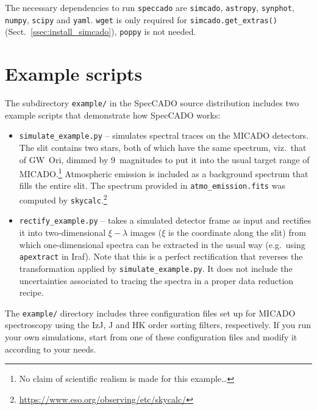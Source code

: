 \documentclass[a4paper,twoside,11pt]{article}
\begin{document}
The necessary dependencies to run \lstinline{speccado} are
\lstinline{simcado}, \lstinline{astropy}, \lstinline{synphot},
\lstinline{numpy}, \lstinline{scipy} and
\lstinline{yaml}. \lstinline{wget} is only required for
\lstinline{simcado.get_extras()} (Sect.~\ref{ssec:install_simcado}),
\lstinline{poppy} is not needed.



\section{Example scripts}
\label{sec:examples}

The subdirectory \lstinline{example/} in the SpecCADO source
distribution includes two example scripts that demonstrate how
SpecCADO works:
\begin{itemize}
\item \lstinline{simulate_example.py} -- simulates spectral traces on
  the MICADO detectors. The slit contains two stars, both of which
  have the same spectrum, viz.~that of GW~Ori, dimmed by 9~magnitudes
  to put it into the usual target range of MICADO.\footnote{No claim
    of scientific realism is made for this example\dots} Atmospheric
  emission is included as a background spectrum that fills the entire
  slit. The spectrum provided in \lstinline{atmo_emission.fits} was
  computed by
  \lstinline{skycalc}.\footnote{\url{https://www.eso.org/observing/etc/skycalc/}}
\item \lstinline{rectify_example.py} -- takes a simulated detector
  frame as input and rectifies it into two-dimensional $\xi-\lambda$
  images ($\xi$ is the coordinate along the slit) from which
  one-dimensional spectra can be extracted in the usual way
  (e.g.~using \lstinline{apextract} in Iraf). Note that this is a
  perfect rectification that reverses the transformation applied by
  \lstinline{simulate_example.py}. It does not include the
  uncertainties associated to tracing the spectra in a proper data
  reduction recipe.
\end{itemize}

The \lstinline{example/} directory includes three configuration files
set up for MICADO spectroscopy using the IzJ, J and HK order sorting
filters, respectively. If you run your own simulations, start from one
of these configuration files and modify it according to your needs.
\end{document}
